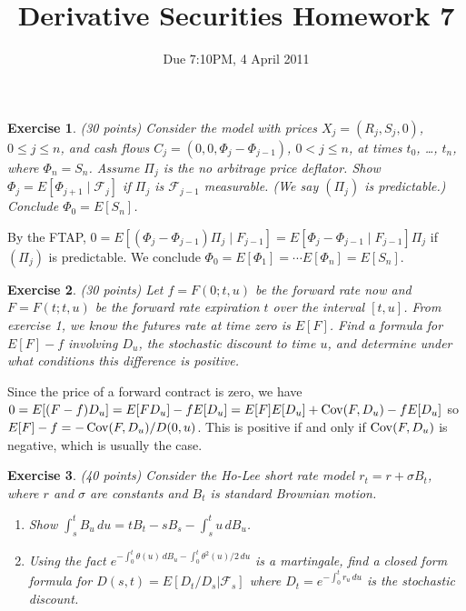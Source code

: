 \documentclass[11pt,fleqn]{amsproc}
\newcommand{\F}{\mathcal{F}}
\newcommand{\Cov}{\mathop{\rm{Cov}}}
\newtheorem{xca}{Exercise}
\begin{document}
\title{Derivative Securities Homework 7}
\author{Due 7:10PM, 4 April 2011}

\maketitle

\begin{xca}{(30 points)}
Consider the model with prices $X_j = (R_j, S_j, 0)$, $0\le j\le n$,
and cash flows $C_j = (0, 0, \Phi_j - \Phi_{j-1})$, $0 < j\le n$,
at times $t_0$, \dots, $t_n$, where $\Phi_n = S_n$.
Assume $\Pi_j$
is the no arbitrage price deflator.
Show $\Phi_j = E[\Phi_{j+1}\mid \F_j]$ if $\Pi_j$ is
$\F_{j-1}$ measurable. (We say $(\Pi_j)$ is {\em predictable}.)
Conclude $\Phi_0 = E[S_n]$.
\end{xca}

By the FTAP, $0 = E[(\Phi_j - \Phi_{j-1})\Pi_j\mid F_{j-1}]
= E[\Phi_j - \Phi_{j-1}\mid F_{j-1}]\Pi_j$
if $(\Pi_j)$ is predictable. We conclude
$\Phi_0 = E[\Phi_1] = \cdots E[\Phi_n] = E[S_n]$.

\begin{xca}{(30 points)}
Let $f = F(0;t,u)$ be the forward rate now and $F = F(t;t,u)$
be the forward rate expiration $t$ over the interval $[t,u]$.
From exercise 1, we know the futures rate at time zero is
$E[F]$. Find a formula for $E[F] - f$ involving $D_u$, the
stochastic discount to time $u$, and determine
under what conditions this difference is positive.
\end{xca}

Since the price of a forward contract is zero, we have
$0 = E[(F - f)D_u] = E[FD_u] - fE[D_u] = E[F]E[D_u] + \Cov(F,D_u)
- fE[D_u]$ so $E[F] - f = -\Cov(F,D_u)/D(0,u)$.  This is positive
if and only if $\Cov(F,D_u)$ is negative, which is usually the case.

\begin{xca}{(40 points)}
Consider the Ho-Lee short rate model $r_t = r + \sigma B_t$, where $r$
and $\sigma$ are constants and $B_t$ is standard Brownian motion.
\begin{enumerate}
\item Show $\int_s^t B_u\,du = tB_t - sB_s - \int_s^t u\,dB_u$.
\item Using the fact $e^{-\int_0^t\theta(u)\,dB_u - \int_0^t\theta^2(u)/2\,du}$
is a martingale, find a closed form formula for
$D(s,t) = E[D_t/D_s|\F_s]$ where $D_t = e^{-\int_0^t r_u\,du}$ is
the stochastic discount.
\end{enumerate}
\end{xca}
\end{document}
